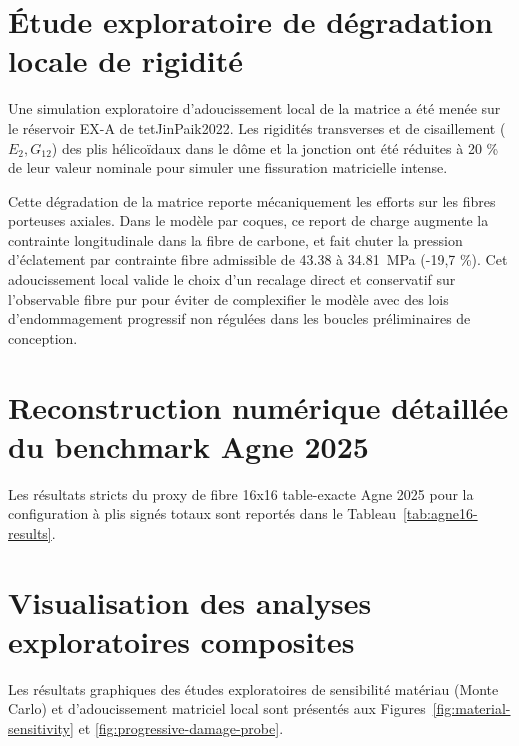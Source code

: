 \documentclass[10pt,twocolumn]{article}
\begin{document}
\section{Étude exploratoire de dégradation locale de rigidité}

Une simulation exploratoire d'adoucissement local de la matrice a été menée sur le réservoir EX-A de 	tet{JinPaik2022}. Les rigidités transverses et de cisaillement ($E_2, G_{12}$) des plis hélicoïdaux dans le dôme et la jonction ont été réduites à 20 \% de leur valeur nominale pour simuler une fissuration matricielle intense. 

Cette dégradation de la matrice reporte mécaniquement les efforts sur les fibres porteuses axiales. Dans le modèle par coques, ce report de charge augmente la contrainte longitudinale dans la fibre de carbone, et fait chuter la pression d'éclatement par contrainte fibre admissible de \num{43.38} à \SI{34.81}{MPa} (-19,7 \%). Cet adoucissement local valide le choix d'un recalage direct et conservatif sur l'observable fibre pur pour éviter de complexifier le modèle avec des lois d'endommagement progressif non régulées dans les boucles préliminaires de conception.

\section{Reconstruction numérique détaillée du benchmark Agne 2025}

Les résultats stricts du proxy de fibre 16x16 table-exacte Agne 2025 pour la configuration à plis signés totaux sont reportés dans le Tableau~\ref{tab:agne16-results}. 

\begin{table}[h]
  \centering
  \caption{Résultats stricts du proxy de fibre 16x16 table-exacte Agne 2025. Ici $p_f$ est la pression déduite du ratio de contrainte de fibre maximum. Le tableau ne doit pas être lu comme une validation expérimentale finale car le modèle de coque reste élastique linéaire et la convention de comptage des couches n'est pas résolue.}
  \label{tab:agne16-results}
  \resizebox{\textwidth}{!}{}
\end{table}

\section{Visualisation des analyses exploratoires composites}

Les résultats graphiques des études exploratoires de sensibilité matériau (Monte Carlo) et d'adoucissement matriciel local sont présentés aux Figures~\ref{fig:material-sensitivity} et \ref{fig:progressive-damage-probe}.
\end{document}

